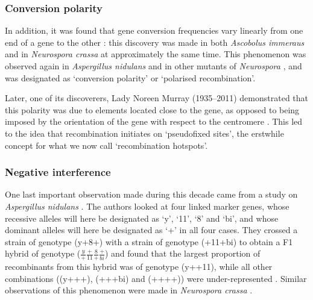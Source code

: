 \subsubsection{Conversion polarity}

In addition, it was found that gene conversion frequencies vary linearly from one end of a gene to the other \citep[reviewed in][]{nicolas1994polarity}: this discovery was made in both \textit{Ascobolus immeraus} \citep{lissouba1960existence,lissouba1962fine} and in \textit{Neurospora crassa} \citep{murray1960complementation} at approximately the same time. 
This phenomenon was observed again in \textit{Aspergillus nidulans} \citep{siddiqi1962mutagenic} and in other mutants of \textit{Neurospora} \citep{stadler1963recombination}, and was designated as ‘conversion polarity’ or ‘polarised recombination’.

Later, one of its discoverers, Lady Noreen Murray (1935--2011) demonstrated that this polarity was due to elements located close to the gene, as opposed to being imposed by the orientation of the gene with respect to the centromere \citep{murray1968polarized}. This led to the idea that recombination initiates on ‘pseudofixed sites’, the erstwhile concept for what we now call ‘recombination hotspots’.





\subsubsection{Negative interference}

One last important observation made during this decade came from a study on \textit{Aspergillus nidulans} \citep{pritchard1955linear}.
The authors looked at four linked marker genes, whose recessive alleles will here be designated as ‘y’, ‘11’, ‘8’ and ‘bi’, and whose dominant alleles will here be designated as ‘+’ in all four cases. 
They crossed a strain of genotype (y+8+) with a strain of genotype (+11+bi) to obtain a F1 hybrid of genotype ($\frac{y}{+}\frac{+}{11}\frac{8}{+}\frac{+}{bi}$) and found that the largest proportion of recombinants from this hybrid was of genotype (y++11), while all other combinations ((y+++), (+++bi) and (++++)) were under-represented \citep[reviewed in][]{whitehouse1965crossing}.
Similar observations of this phenomenon were made in \textit{Neurospora crassa} \citep{mitchell1956consideration}.

